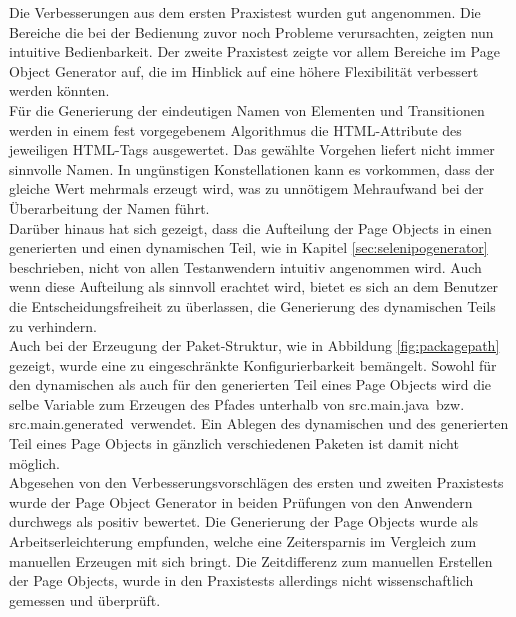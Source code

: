 Die Verbesserungen aus dem ersten Praxistest wurden gut angenommen. Die Bereiche die bei der Bedienung zuvor noch Probleme verursachten, zeigten nun intuitive Bedienbarkeit.
Der zweite Praxistest zeigte vor allem Bereiche im Page Object Generator auf, die im Hinblick auf eine höhere Flexibilität verbessert werden könnten.\\
Für die Generierung der eindeutigen Namen von Elementen und Transitionen werden in einem fest vorgegebenem Algorithmus die HTML-Attribute des jeweiligen HTML-Tags ausgewertet. Das gewählte Vorgehen liefert nicht immer sinnvolle Namen. In ungünstigen Konstellationen kann es vorkommen, dass der gleiche Wert mehrmals erzeugt wird, was zu unnötigem Mehraufwand bei der Überarbeitung der Namen führt.\\
Darüber hinaus hat sich gezeigt, dass die Aufteilung der Page Objects in einen generierten und einen dynamischen Teil, wie in Kapitel \ref{sec:selenipogenerator} beschrieben, nicht von allen Testanwendern intuitiv angenommen wird.
Auch wenn diese Aufteilung als sinnvoll erachtet wird, bietet es sich an dem Benutzer die Entscheidungsfreiheit zu überlassen, die Generierung des dynamischen Teils zu verhindern.\\
Auch bei der Erzeugung der Paket-Struktur, wie in Abbildung \ref{fig:packagepath} gezeigt, wurde eine zu eingeschränkte Konfigurierbarkeit bemängelt.
Sowohl für den dynamischen als auch für den generierten Teil eines Page Objects wird die selbe Variable zum Erzeugen des Pfades unterhalb von \grq src.main.java\grq\ bzw. \grq src.main.generated\grq\ verwendet. Ein Ablegen des dynamischen und des generierten Teil eines Page Objects in gänzlich verschiedenen Paketen ist damit nicht möglich.\\
Abgesehen von den Verbesserungsvorschlägen des ersten und zweiten Praxistests wurde der Page Object Generator in beiden Prüfungen von den Anwendern durchwegs als positiv bewertet. Die Generierung der Page Objects wurde als Arbeitserleichterung empfunden, welche eine Zeitersparnis im Vergleich zum manuellen Erzeugen mit sich bringt. Die Zeitdifferenz zum manuellen Erstellen der Page Objects, wurde in den Praxistests allerdings nicht wissenschaftlich gemessen und überprüft.


